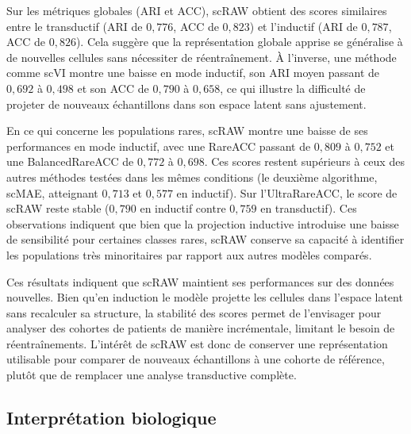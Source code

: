 Sur les métriques globales (ARI et ACC), scRAW obtient des scores similaires entre le transductif (ARI de $0{,}776$, ACC de $0{,}823$) et l'inductif (ARI de $0{,}787$, ACC de $0{,}826$). Cela suggère que la représentation globale apprise se généralise à de nouvelles cellules sans nécessiter de réentraînement. À l'inverse, une méthode comme scVI montre une baisse en mode inductif, son ARI moyen passant de $0{,}692$ à $0{,}498$ et son ACC de $0{,}790$ à $0{,}658$, ce qui illustre la difficulté de projeter de nouveaux échantillons dans son espace latent sans ajustement.

En ce qui concerne les populations rares, scRAW montre une baisse de ses performances en mode inductif, avec une RareACC passant de $0{,}809$ à $0{,}752$ et une BalancedRareACC de $0{,}772$ à $0{,}698$. Ces scores restent supérieurs à ceux des autres méthodes testées dans les mêmes conditions (le deuxième algorithme, scMAE, atteignant $0{,}713$ et $0{,}577$ en inductif). Sur l'UltraRareACC, le score de scRAW reste stable ($0{,}790$ en inductif contre $0{,}759$ en transductif). Ces observations indiquent que bien que la projection inductive introduise une baisse de sensibilité pour certaines classes rares, scRAW conserve sa capacité à identifier les populations très minoritaires par rapport aux autres modèles comparés.

Ces résultats indiquent que scRAW maintient ses performances sur des données nouvelles. Bien qu'en induction le modèle projette les cellules dans l'espace latent sans recalculer sa structure, la stabilité des scores permet de l'envisager pour analyser des cohortes de patients de manière incrémentale, limitant le besoin de réentraînements. L'intérêt de scRAW est donc de conserver une représentation utilisable pour comparer de nouveaux échantillons à une cohorte de référence, plutôt que de remplacer une analyse transductive complète.

\FloatBarrier
\subsection{Interprétation biologique}


